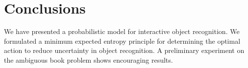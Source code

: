 \section{Conclusions}

We have presented a probabilistic model for interactive object recognition. We formulated a minimum expected entropy principle for determining the optimal action to reduce uncertainty in object recognition. A preliminary experiment on the ambiguous book problem shows encouraging results.


   
